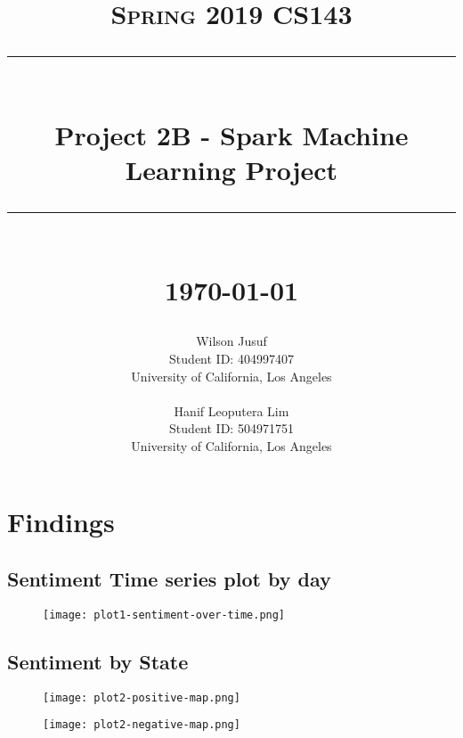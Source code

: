 \documentclass[11pt]{article}
\newcommand{\HRule}[1]{\rule{\linewidth}{#1}}
\begin{document}
\title{ \normalsize \textsc{Spring 2019 CS143}
		\\ [2.0cm]
		\HRule{0.5pt} \\
		\LARGE \textbf{Project 2B - Spark Machine Learning Project}
		\HRule{2pt} \\ [0.5cm]
		\normalsize \today \vspace*{5\baselineskip}}

\date{}

\author{
        Wilson Jusuf\\
		Student ID: 404997407\\
		University of California, Los Angeles\\\\
        Hanif Leoputera Lim\\
		Student ID: 504971751\\
		University of California, Los Angeles}

\maketitle
\newpage
\section{Findings}
\subsection{Sentiment Time series plot by day}
\begin{figure}[H]
    \begin{center}
  \texttt{[image: plot1-sentiment-over-time.png]}
    \end{center}
\end{figure}


\subsection{Sentiment by State}
\begin{figure}[H]
    \begin{center}
  \texttt{[image: plot2-positive-map.png]}
    \end{center}
\end{figure}


\begin{figure}[H]
    \begin{center}
  \texttt{[image: plot2-negative-map.png]}
    \end{center}
\end{figure}
\end{document}

